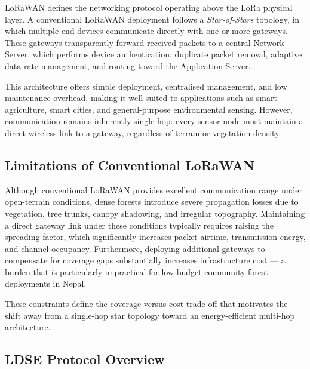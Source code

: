LoRaWAN defines the networking protocol operating above the LoRa physical
layer. A conventional LoRaWAN deployment follows a \textit{Star-of-Stars}
topology, in which multiple end devices communicate directly with one or more
gateways. These gateways transparently forward received packets to a central
Network Server, which performs device authentication, duplicate packet removal,
adaptive data rate management, and routing toward the Application Server.

This architecture offers simple deployment, centralised management, and low
maintenance overhead, making it well suited to applications such as smart
agriculture, smart cities, and general-purpose environmental sensing. However,
communication remains inherently single-hop: every sensor node must maintain a
direct wireless link to a gateway, regardless of terrain or vegetation density.


\subsection{Limitations of Conventional LoRaWAN}

Although conventional LoRaWAN provides excellent communication range under
open-terrain conditions, dense forests introduce severe propagation losses due to
vegetation, tree trunks, canopy shadowing, and irregular topography. Maintaining
a direct gateway link under these conditions typically requires raising the
spreading factor, which significantly increases packet airtime, transmission
energy, and channel occupancy. Furthermore, deploying additional gateways to
compensate for coverage gaps substantially increases infrastructure cost --- a
burden that is particularly impractical for low-budget community forest
deployments in Nepal.

These constraints define the coverage-versus-cost trade-off that motivates the
shift away from a single-hop star topology toward an energy-efficient multi-hop
architecture.


\subsection{LDSE Protocol Overview}
\label{subsec:ldse-overview}

